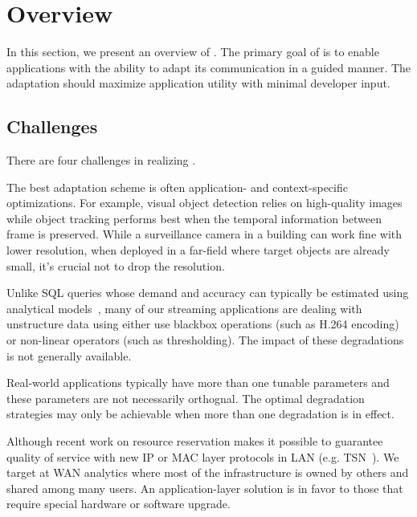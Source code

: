 \section{\sysname{} Overview}
\label{sec:system-overview}

In this section, we present an overview of \sysname{}. The primary goal of
\sysname{} is to enable applications with the ability to adapt its communication
in a guided manner. The adaptation should maximize application utility with
minimal developer input.

\subsection{Challenges}
\label{sec:challenges}

\noindent There are four challenges in realizing \sysname{}.

 The best adaptation scheme is often
application- and context-specific optimizations. For example, visual object
detection relies on high-quality images while object tracking performs best when
the temporal information between frame is preserved. While a surveillance camera
in a building can work fine with lower resolution, when deployed in a far-field
where target objects are already small, it's crucial not to drop the resolution.

 Unlike SQL queries whose demand and accuracy
can typically be estimated using analytical models~\cite{cormode2012synopses},
many of our streaming applications are dealing with unstructure data using
either use blackbox operations (such as H.264 encoding) or non-linear operators
(such as thresholding). The impact of these degradations is not generally
available.

 Real-world applications typically have
more than one tunable parameters and these parameters are not necessarily
orthognal. The optimal degradation strategies may only be achievable when more
than one degradation is in effect.

 Although recent work on
resource reservation makes it possible to guarantee quality of service with new
IP or MAC layer protocols in LAN (e.g. TSN~\cite{johas2013heterogeneous}). We
target at WAN analytics where most of the infrastructure is owned by others and
shared among many users. An application-layer solution is in favor to those that
require special hardware or software upgrade.

